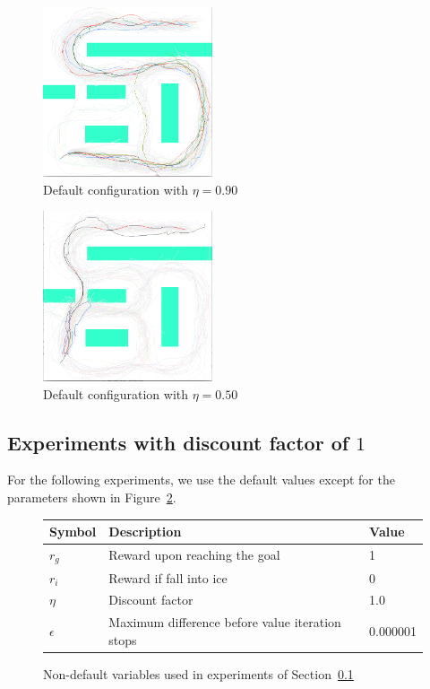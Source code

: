 \documentclass[a4paper]{article}
\begin{document}
\begin{figure}
\caption{Default configuration with $\eta=0.90$}
\centerline{\includegraphics[width=5cm]{b_lowdiscount.png}}
\end{figure}

\begin{figure}
\caption{Default configuration with $\eta=0.50$}
\label{f:b_verylowdiscount}
\centerline{\includegraphics[width=5cm]{b_verylowdiscount.png}}
\end{figure}

\subsection{Experiments with discount factor of $1$}
\label{s:ideal}

For the following experiments, we use the default values except for the
parameters shown in Figure~\ref{f:idealparam}.

\begin{figure}
  \caption{Non-default variables used in experiments of Section~\ref{s:ideal}}
\label{f:idealparam}
\begin{tabular}{ l | l | l }
  Symbol & Description & Value \\ \hline \hline
  $r_g$ & Reward upon reaching the goal & 1 \\ \hline
  $r_i$ & Reward if fall into ice & 0 \\ \hline
  $\eta$ & Discount factor & 1.0 \\ \hline
  $\epsilon$ & Maximum difference before value iteration stops & 0.000001 \\ \hline
\end{tabular}
\end{figure}
\end{document}
